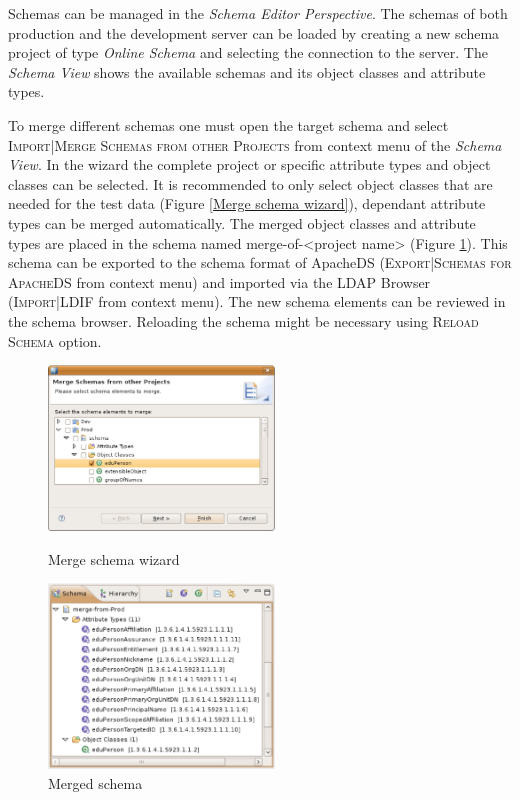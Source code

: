 \documentclass[a4paper,11pt,oneside]{article}
\begin{document}
Schemas can be managed in the \textit{Schema Editor Perspective}. The schemas of both production and the development server can be loaded by creating a new schema project of type \textit{Online Schema} and selecting the connection to the server. The \textit{Schema View} shows the available schemas and its object classes and attribute types.

To merge different schemas one must open the target schema and select \textsc{Import|Merge Schemas from other Projects} from context menu of the \textit{Schema View}. In the wizard the complete project or specific attribute types and object classes can be selected. It is recommended to only select object classes that are needed for the test data (Figure \ref{Merge schema wizard}), dependant attribute types can be merged automatically. The merged object classes and attribute types are placed in the schema named merge-of-<project name> (Figure \ref{Merged schema}). This schema can be exported to the schema format of ApacheDS (\textsc{Export|Schemas for ApacheDS} from context menu) and imported via the LDAP Browser (\textsc{Import|LDIF} from context menu). The new schema elements can be reviewed in the schema browser. Reloading the schema might be necessary using \textsc{Reload Schema} option.

\begin{figure}[htb]
 \begin{minipage}{.45\linewidth}
  \begin{center}
  \includegraphics[width=6cm]{images/03_merge_schema_wizard.eps}
  \caption{Merge schema wizard}
  \label{Merge schema wizard}
  \end{center}
 \end{minipage}
 \hspace{.1\linewidth}%
 \begin{minipage}{.45\linewidth}
  \begin{center}
  \includegraphics[width=6cm]{images/04_merge_schema_finished.eps}
  \caption{Merged schema}
  \label{Merged schema}
  \end{center}
 \end{minipage}
\end{figure}
\end{document}
